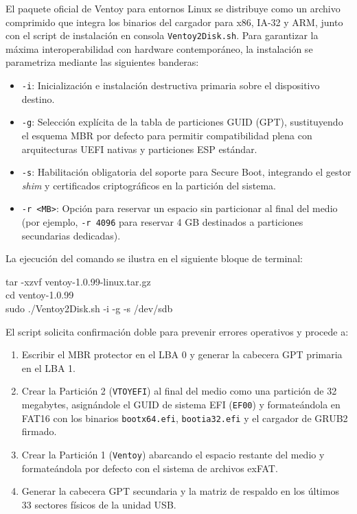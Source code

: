 \documentclass[12pt]{article}
\begin{document}
El paquete oficial de Ventoy para entornos Linux se distribuye como un archivo comprimido que integra los binarios del cargador para x86, IA-32 y ARM, junto con el script de instalación en consola \texttt{Ventoy2Disk.sh}. Para garantizar la máxima interoperabilidad con hardware contemporáneo, la instalación se parametriza mediante las siguientes banderas:
\begin{itemize}[noitemsep, topsep=1pt]
    \item \texttt{-i}: Inicialización e instalación destructiva primaria sobre el dispositivo destino.
    \item \texttt{-g}: Selección explícita de la tabla de particiones GUID (GPT), sustituyendo el esquema MBR por defecto para permitir compatibilidad plena con arquitecturas UEFI nativas y particiones ESP estándar.
    \item \texttt{-s}: Habilitación obligatoria del soporte para Secure Boot, integrando el gestor \textit{shim} y certificados criptográficos en la partición del sistema.
    \item \texttt{-r <MB>}: Opción para reservar un espacio sin particionar al final del medio (por ejemplo, \texttt{-r 4096} para reservar 4 GB destinados a particiones secundarias dedicadas).
\end{itemize}

La ejecución del comando se ilustra en el siguiente bloque de terminal:

\begin{mdframed}[style=terminal]
\ttfamily\upshape\color{bashLetterColor}\footnotesize
tar -xzvf ventoy-1.0.99-linux.tar.gz \\
cd ventoy-1.0.99 \\
sudo ./Ventoy2Disk.sh -i -g -s /dev/sdb
\end{mdframed}

El script solicita confirmación doble para prevenir errores operativos y procede a:
\begin{enumerate}[noitemsep, topsep=2pt]
    \item Escribir el MBR protector en el LBA 0 y generar la cabecera GPT primaria en el LBA 1.
    \item Crear la Partición 2 (\texttt{VTOYEFI}) al final del medio como una partición de 32 megabytes, asignándole el GUID de sistema EFI (\texttt{EF00}) y formateándola en FAT16 con los binarios \texttt{bootx64.efi}, \texttt{bootia32.efi} y el cargador de GRUB2 firmado.
    \item Crear la Partición 1 (\texttt{Ventoy}) abarcando el espacio restante del medio y formateándola por defecto con el sistema de archivos exFAT.
    \item Generar la cabecera GPT secundaria y la matriz de respaldo en los últimos 33 sectores físicos de la unidad USB.
\end{enumerate}
\end{document}
